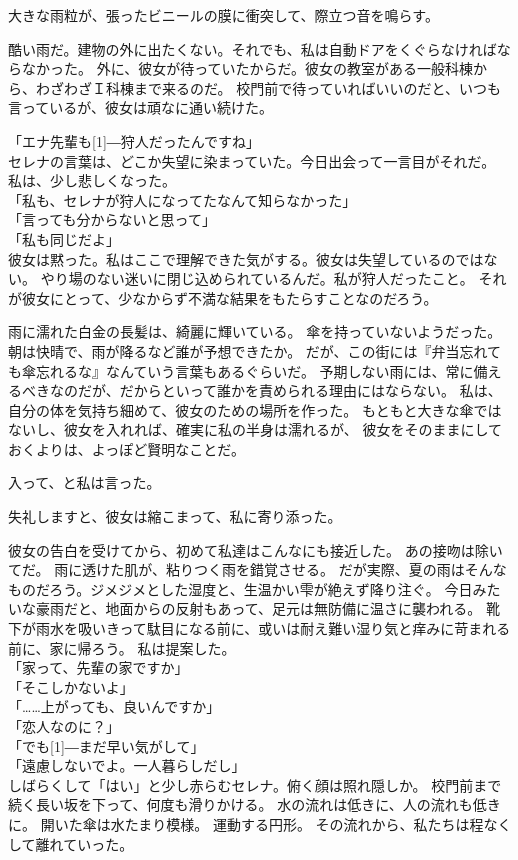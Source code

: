 \documentclass[../IHMain]{subfiles}
\begin{document}
大きな雨粒が、張ったビニールの膜に衝突して、際立つ音を鳴らす。

酷い雨だ。建物の外に出たくない。それでも、私は自動ドアをくぐらなければならなかった。
外に、彼女が待っていたからだ。彼女の教室がある一般科棟から、わざわざＩ科棟まで来るのだ。
校門前で待っていればいいのだと、いつも言っているが、彼女は頑なに通い続けた。

「エナ先輩も\scalebox{3}[1]{―}狩人だったんですね」\\
セレナの言葉は、どこか失望に染まっていた。今日出会って一言目がそれだ。
私は、少し悲しくなった。\\
「私も、セレナが狩人になってたなんて知らなかった」\\
「言っても分からないと思って」\\
「私も同じだよ」\\
彼女は黙った。私はここで理解できた気がする。彼女は失望しているのではない。
やり場のない迷いに閉じ込められているんだ。私が狩人だったこと。
それが彼女にとって、少なからず不満な結果をもたらすことなのだろう。

雨に濡れた白金の長髪は、綺麗に輝いている。
傘を持っていないようだった。朝は快晴で、雨が降るなど誰が予想できたか。
だが、この街には『弁当忘れても傘忘れるな』なんていう言葉もあるぐらいだ。
予期しない雨には、常に備えるべきなのだが、だからといって誰かを責められる理由にはならない。
私は、自分の体を気持ち細めて、彼女のための場所を作った。
もともと大きな傘ではないし、彼女を入れれば、確実に私の半身は濡れるが、
彼女をそのままにしておくよりは、よっぽど賢明なことだ。

入って、と私は言った。

失礼しますと、彼女は縮こまって、私に寄り添った。

彼女の告白を受けてから、初めて私達はこんなにも接近した。
あの接吻は除いてだ。
雨に透けた肌が、粘りつく雨を錯覚させる。
だが実際、夏の雨はそんなものだろう。ジメジメとした湿度と、生温かい雫が絶えず降り注ぐ。
今日みたいな豪雨だと、地面からの反射もあって、足元は無防備に温さに襲われる。
靴下が雨水を吸いきって駄目になる前に、或いは耐え難い湿り気と痒みに苛まれる前に、家に帰ろう。
私は提案した。\\
「家って、先輩の家ですか」\\
「そこしかないよ」\\
「……上がっても、良いんですか」\\
「恋人なのに？」\\
「でも\scalebox{3}[1]{―}まだ早い気がして」\\
「遠慮しないでよ。一人暮らしだし」\\
しばらくして「はい」と少し赤らむセレナ。俯く顔は照れ隠しか。
校門前まで続く長い坂を下って、何度も滑りかける。
水の流れは低きに、人の流れも低きに。
開いた傘は水たまり模様。
運動する円形。
その流れから、私たちは程なくして離れていった。
\end{document}
